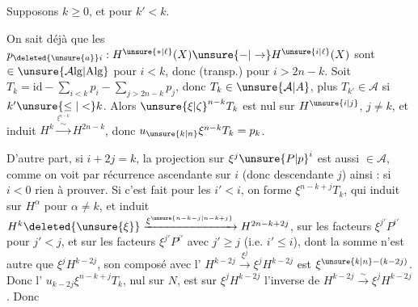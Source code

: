 Supposons $k\geq 0$, et    pour $k'<k$.

On sait déjà que les $p_{\deleted{\unsure{a}}i}:H^{\unsure{*|\ell}}(X)\unsure{-|\to}H^{\unsure{i|\ell}}(X)$
sont $\in\unsure{\mathcal{A}\mathrm{lg}|\mathrm{Alg}}$ pour $i<k$, donc (transp.) pour
$i>2n-k$. Soit $T_k=\mathrm{id}-\sum_{i<k}p_i-\sum_{j>2n-k}p_j$, donc
$T_k\in\unsure{\mathcal{A}|A}$, plus  $T_{k'}\in\mathcal{A}$ si $k'\unsure{\leq|<}k$. Alors
$\unsure{\xi|\zeta}^{n-k}T_k$ est nul sur $H^{\unsure{i|j}}$, $j\neq k$, et induit
$H^k\xrightarrow{\overset{\xi^{n-k}}{\sim}}H^{2n-k}$, donc $u_{\unsure{k|n}}\xi^{n-k}T_k=p_k$.

D'autre part, si $i+2j=k$, la projection sur
$\xi^j\unsure{P|p}^{i}$ est aussi $\in\mathcal{A}$, comme on voit 
par récurrence ascendante sur $i$ (donc descendante 
$j$) ainsi : si $i<0$ rien à prouver. Si c'est
fait pour les $i'<i$, on forme
$\xi^{n-k+j}T_k$,  qui induit  sur $H^\alpha$ pour $\alpha\neq k$,
et induit $H^{k}\deleted{\unsure{\xi}}\xrightarrow{\xi^{\unsure{n-k-j|n-k+j}}}H^{2n-k+2j}$, 
sur les facteurs $\xi^{j'}P^{i'}$ pour $j'<j$,  et sur
les facteurs $\xi^{j'}P^{i'}$ avec $j'\geq j$ (i.e. $i'\leq i$),
 dont la somme n'est autre
que $\xi^j H^{k-2j}$, son composé avec l'
$H^{k-2j}\xrightarrow{\xi^{j}}\xi^j H^{k-2j}$ est $\xi^{\unsure{k|n}-(k-2j)}$. Donc l'
$u_{k-2j}\xi^{n-k+j}T_k$\unsure{:|,|;}, nul sur $N$, est sur $\xi^j H^{k-2j}$
l'inverse de $H^{k-2j}\xrightarrow{\sim}\xi^j H^{k-2j}$. Donc

